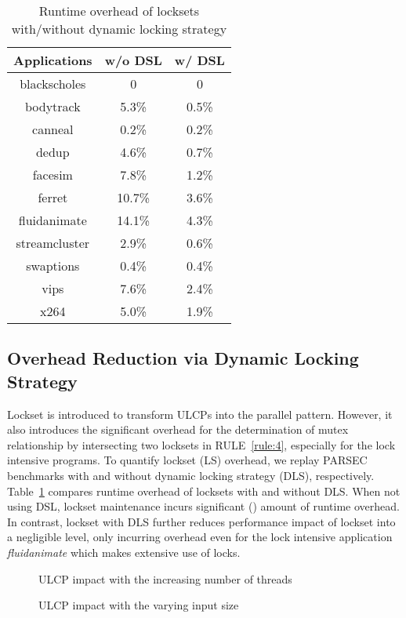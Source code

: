 \begin{table}[tbp]   \caption{Runtime overhead of locksets with/without dynamic locking strategy}
\small
\tabcolsep=0.1cm
\setlength{\abovecaptionskip}{10pt}
\setlength{\belowcaptionskip}{-10pt}
\centering
\centering
\begin{tabular}{|c|c|c|}\hline
\textbf{Applications}& \textbf{w/o DSL}& \textbf{w/ DSL} \\ \hline \hline
{\sf blackscholes}& 0& 0 \\
{\sf bodytrack}& 5.3\% & 0.5\% \\
{\sf canneal}& 0.2\%& 0.2\%\\
{\sf dedup} &4.6\% & 0.7\%\\
{\sf facesim}&7.8\% &1.2\%  \\
{\sf ferret}& 10.7\%&3.6\% \\
{\sf fluidanimate}& 14.1\%& 4.3\%  \\
{\sf streamcluster}& 2.9\%&0.6\% \\
{\sf swaptions}& 0.4\%& 0.4\% \\
{\sf vips} &7.6\% & 2.4\% \\
{\sf x264}& 5.0\%& 1.9\% \\ \hline
\end{tabular}
\label{table:dsl}
\end{table}
\subsection{Overhead Reduction via Dynamic Locking Strategy}
Lockset is introduced to transform ULCPs into the parallel pattern. However, it also introduces the significant overhead for the determination of mutex relationship by intersecting two locksets in RULE~\ref{rule:4}, especially for the lock intensive programs. To quantify lockset (LS) overhead, we replay PARSEC benchmarks with and without dynamic locking strategy (DLS), respectively. Table~\ref{table:dsl} compares runtime overhead of locksets with and without DLS. When not using DSL, lockset maintenance incurs significant () amount of runtime overhead. In contrast, lockset with DLS further reduces performance impact of lockset into a negligible level, only incurring  overhead even for the lock intensive application \emph{fluidanimate} which makes extensive use of locks.


\begin{figure}[tpb]
\centering
 \hfill
 \caption{ULCP impact with the increasing number of threads}
 \label{fig:perfImpact:threadnum}
\end{figure}
\begin{figure}[tpb]
\centering
 \hfill
  \caption{ULCP impact with the varying input size}
 \label{fig:perfImpact:input}
\end{figure}
